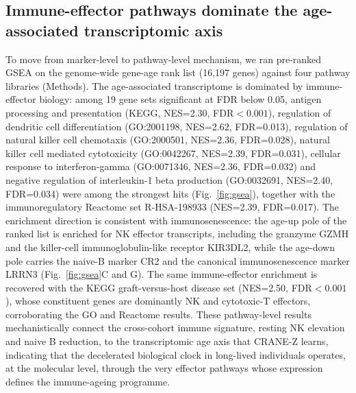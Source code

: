 \documentclass[11pt,a4paper]{article}
\begin{document}
\subsection{Immune-effector pathways dominate the age-associated transcriptomic axis}\label{sec:res7}
To move from marker-level to pathway-level mechanism, we ran pre-ranked GSEA on the genome-wide gene-age rank list (16,197 genes) against four pathway libraries (Methods). The age-associated transcriptome is dominated by immune-effector biology: among 19 gene sets significant at FDR below 0.05, antigen processing and presentation (KEGG, NES=2.30, FDR$<0.001$), regulation of dendritic cell differentiation (GO:2001198, NES=2.62, FDR=0.013), regulation of natural killer cell chemotaxis (GO:2000501, NES=2.36, FDR=0.028), natural killer cell mediated cytotoxicity (GO:0042267, NES=2.39, FDR=0.031), cellular response to interferon-gamma (GO:0071346, NES=2.36, FDR=0.032) and negative regulation of interleukin-1 beta production (GO:0032691, NES=2.40, FDR=0.034) were among the strongest hits (Fig.~\ref{fig:gsea}), together with the immunoregulatory Reactome set R-HSA-198933 (NES=2.39, FDR=0.017). The enrichment direction is consistent with immunosenescence: the age-up pole of the ranked list is enriched for NK effector transcripts, including the granzyme GZMH and the killer-cell immunoglobulin-like receptor KIR3DL2, while the age-down pole carries the naive-B marker CR2 and the canonical immunosenescence marker LRRN3 (Fig.~\ref{fig:gsea}C and G). The same immune-effector enrichment is recovered with the KEGG graft-versus-host disease set (NES=2.50, FDR$<0.001$), whose constituent genes are dominantly NK and cytotoxic-T effectors, corroborating the GO and Reactome results. These pathway-level results mechanistically connect the cross-cohort immune signature, resting NK elevation and naive B reduction, to the transcriptomic age axis that CRANE-Z learns, indicating that the decelerated biological clock in long-lived individuals operates, at the molecular level, through the very effector pathways whose expression defines the immune-ageing programme.
\end{document}
